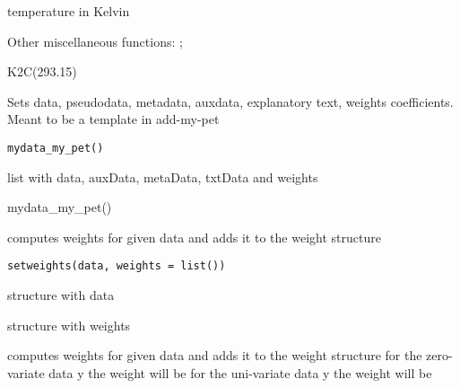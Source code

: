 \documentclass[a4paper]{book}
\begin{document}
%
\begin{Value}
temperature in Kelvin
\end{Value}
%
\begin{SeeAlso}\relax
Other miscellaneous functions: ;
\end{SeeAlso}
%
\begin{Examples}
\begin{ExampleCode}
K2C(293.15)
\end{ExampleCode}
\end{Examples}
%
\begin{Description}\relax
Sets data, pseudodata, metadata, auxdata, explanatory text, weights coefficients. Meant to be a template in add-my-pet
\end{Description}
%
\begin{Usage}
\begin{verbatim}
mydata_my_pet()
\end{verbatim}
\end{Usage}
%
\begin{Value}
list with data, auxData, metaData, txtData and weights
\end{Value}
%
\begin{Examples}
\begin{ExampleCode}
mydata_my_pet()
\end{ExampleCode}
\end{Examples}
%
\begin{Description}\relax
computes weights for given data and adds it to the weight structure
\end{Description}
%
\begin{Usage}
\begin{verbatim}
setweights(data, weights = list())
\end{verbatim}
\end{Usage}
%
\begin{Arguments}
\begin{ldescription}
\item[\code{data}] structure with data

\item[\code{weights}] structure with weights
\end{ldescription}
\end{Arguments}
%
\begin{Details}\relax
computes weights for given data and adds it to the weight structure
for the zero-variate data y the weight will be
for the uni-variate data y the weight will be
\end{Details}
\end{document}
